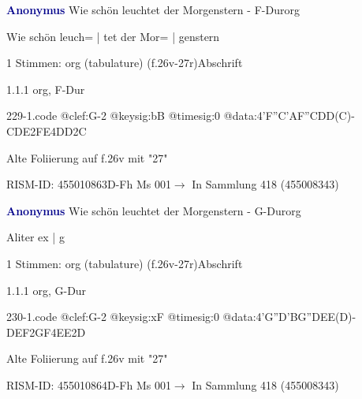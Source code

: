 \documentclass[twocolumn]{book}
\begin{document}
\par \vspace{7pt} \textcolor{darkblue}{\textbf{Anonymus  }}\hfillplus{\textbf{[229]}}\newline Wie schön leuchtet der Morgenstern - F-Dur\newline org
\par \begin{itshape}[f.26v, at left:] Wie schön leuch= | tet der Mor= | genstern\end{itshape} 
\par \textcolor{darkblue}{}  1 Stimmen: org (tabulature)  (f.26v-27r)\newline Abschrift
\par 1.1.1  org, F-Dur  
\begin{filecontents*}{229-1.code}
@clef:G-2
@keysig:bB
@timesig:0
@data:4'F''C'AF''CDD(C)-CDE2FE4DD2C
\end{filecontents*}
\newline
%
\par Alte Foliierung auf f.26v mit "27"
\par RISM-ID: 455010863\newline D-Fh  Ms 001\newline $\rightarrow$ In Sammlung 418 (455008343)
      
\par \vspace{7pt} \textcolor{darkblue}{\textbf{Anonymus  }}\hfillplus{\textbf{[230]}}\newline Wie schön leuchtet der Morgenstern - G-Dur\newline org
\par \begin{itshape}[f.26v, at left:] Aliter ex | g\end{itshape} 
\par \textcolor{darkblue}{}  1 Stimmen: org (tabulature)  (f.26v-27r)\newline Abschrift
\par 1.1.1  org, G-Dur  
\begin{filecontents*}{230-1.code}
@clef:G-2
@keysig:xF
@timesig:0
@data:4'G''D'BG''DEE(D)-DEF2GF4EE2D
\end{filecontents*}
\newline
%
\par Alte Foliierung auf f.26v mit "27"
\par RISM-ID: 455010864\newline D-Fh  Ms 001\newline $\rightarrow$ In Sammlung 418 (455008343)
      
\end{document}
